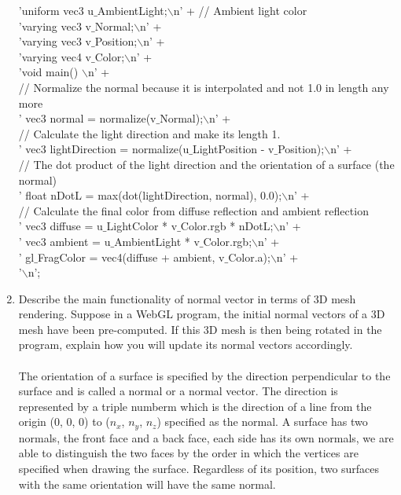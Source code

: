 \documentclass{mm2}
\begin{document}
\begin{enumerate}
'uniform vec3 u$\_$AmbientLight;$\backslash$n' +   // Ambient light color\\
'varying vec3 v$\_$Normal;$\backslash$n' +\\
'varying vec3 v$\_$Position;$\backslash$n' +\\
'varying vec4 v$\_$Color;$\backslash$n' +\\
'void main() {$\backslash$n' +\\
// Normalize the normal because it is interpolated and not 1.0 in length any more\\
'  vec3 normal = normalize(v$\_$Normal);$\backslash$n' +\\
// Calculate the light direction and make its length 1.\\
'  vec3 lightDirection = normalize(u$\_$LightPosition - v$\_$Position);$\backslash$n' +\\
// The dot product of the light direction and the orientation of a surface (the normal) \\
'  float nDotL = max(dot(lightDirection, normal), 0.0);$\backslash$n' +\\
// Calculate the final color from diffuse reflection and ambient reflection\\
'  vec3 diffuse = u$\_$LightColor * v$\_$Color.rgb * nDotL;$\backslash$n' +\\
'  vec3 ambient = u$\_$AmbientLight * v$\_$Color.rgb;$\backslash$n' +\\
'  gl$\_$FragColor = vec4(diffuse + ambient, v$\_$Color.a);$\backslash$n' +\\
'}$\backslash$n';\\



\item Describe the main functionality of normal vector in terms of 3D mesh rendering. Suppose in a WebGL program, the initial normal vectors of a 3D mesh have been pre-computed. If this 3D mesh is then being rotated in the program, explain how you will update its normal vectors accordingly. \\
\\
The orientation of a surface is specified by the direction perpendicular to the surface and is called a normal or a normal vector. The direction is represented by a triple numberm which is the direction of a line from the origin ($0$, $0$, $0$) to ($n_x$, $n_y$, $n_z$) specified as the normal. A surface has two normals, the front face and a back face, each side has its own normals, we are able to distinguish the two faces by the order in which the vertices are specified when drawing the surface. Regardless of its position, two surfaces with the same orientation will have the same normal.\\


\end{enumerate}
\end{document}
